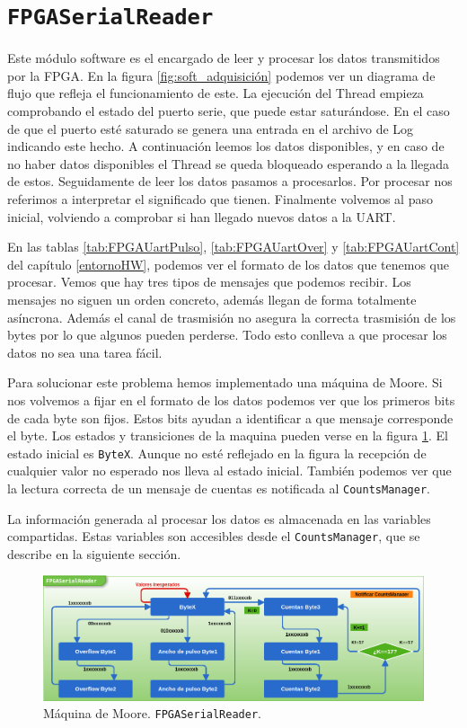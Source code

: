 \section{\texttt{FPGASerialReader}}
	Este módulo software es el encargado de leer y procesar los datos transmitidos por la FPGA. En la figura \ref{fig:soft_adquisición} podemos
	ver un diagrama de flujo que refleja el funcionamiento de este. La ejecución del Thread empieza comprobando el estado del puerto serie, que
	puede estar saturándose. En el caso de que el puerto esté saturado se genera una entrada en el archivo de Log indicando este hecho. A
	continuación leemos los datos disponibles, y en caso de no haber datos disponibles el Thread se queda bloqueado esperando a la llegada de
	estos. Seguidamente de leer los datos pasamos a procesarlos. Por procesar nos referimos a interpretar el significado que tienen. Finalmente
	volvemos al paso inicial, volviendo a comprobar si han llegado nuevos datos a la UART.
	\par
	En las tablas \ref{tab:FPGAUartPulso}, \ref{tab:FPGAUartOver} y \ref{tab:FPGAUartCont}  del capítulo \ref{entornoHW}, podemos ver el formato
	de los datos que tenemos que procesar. Vemos que hay tres tipos de mensajes que podemos recibir. Los mensajes no siguen un orden concreto,
	además llegan de forma totalmente asíncrona. Además el canal de trasmisión no asegura la correcta trasmisión de los bytes por lo que algunos
	pueden perderse. Todo esto conlleva a que procesar los datos no sea una tarea fácil.
	\par
	Para solucionar este problema hemos implementado una máquina de Moore. Si nos volvemos a fijar en el formato de los datos podemos ver que los
	primeros bits de cada byte son fijos. Estos bits ayudan a identificar a que mensaje corresponde el byte. Los estados y transiciones de la
	maquina pueden verse en la figura \ref{fig:reader}. El estado inicial es \texttt{ByteX}. Aunque no esté reflejado en la figura la recepción de
	cualquier valor no esperado nos lleva al estado inicial. También podemos ver que la lectura correcta de un mensaje de cuentas es notificada al
	\texttt{CountsManager}.
	\par
	La información generada al procesar los datos es almacenada en las variables compartidas. Estas variables son accesibles desde el
	\texttt{CountsManager}, que se describe en la siguiente sección.
	\begin{figure}[h]
		\centering
		\includegraphics[keepaspectratio, width=1\textwidth]{./img/reader.png}
		\caption{Máquina de Moore. \texttt{FPGASerialReader}.}   
		\label{fig:reader}
	\end{figure}

